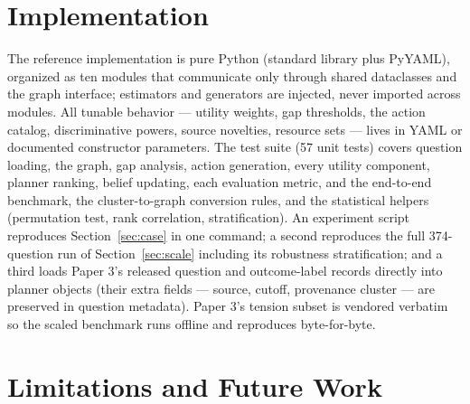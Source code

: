 \documentclass[11pt]{article}
\begin{document}
\section{Implementation}

The reference implementation is pure Python (standard library plus
PyYAML), organized as ten modules that communicate only through shared
dataclasses and the graph interface; estimators and generators are
injected, never imported across modules. All tunable behavior ---
utility weights, gap thresholds, the action catalog, discriminative
powers, source novelties, resource sets --- lives in YAML or documented
constructor parameters. The test suite (57 unit tests) covers question
loading, the graph, gap analysis, action generation, every utility
component, planner ranking, belief updating, each evaluation metric, and
the end-to-end benchmark, the cluster-to-graph conversion rules, and
the statistical helpers (permutation test, rank correlation,
stratification). An experiment script reproduces Section~\ref{sec:case}
in one command; a second reproduces the full 374-question run of
Section~\ref{sec:scale} including its robustness stratification; and a
third loads Paper 3's released question and outcome-label records
directly into planner objects (their extra fields --- source, cutoff,
provenance cluster --- are preserved in question metadata). Paper 3's
tension subset is vendored verbatim so the scaled benchmark runs
offline and reproduces byte-for-byte.

\section{Limitations and Future Work}
\end{document}
